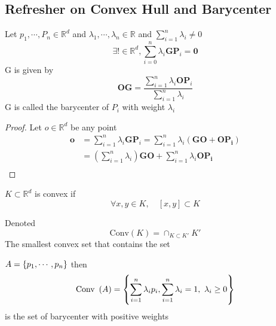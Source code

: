 \subsection{Refresher on Convex Hull and Barycenter}
\label{subsec:Refresher on Convex Hull}
\begin{prop}[]
    Let $ p_1, \cdots, P_n \in \mathbb{R}^d $ and $ \lambda_1, \cdots , \lambda_n \in
    \mathbb{R} $ and $ \sum_{i=1}^{n} \lambda_i \neq 0 $
    \[
    \exists ! \in \mathbb{R}^d , \sum_{i=0}^{n} \lambda_i \boldsymbol{GP} _i =
    \boldsymbol{0} 
    \]
    G is given by 
    \[
    \boldsymbol{OG} = \frac{ \sum_{i=1}^{n} \lambda_i \boldsymbol{OP} _i }{ \sum_{i=1}^{n}
    \lambda_i } 
    \]
    G is called the barycenter of $ P_i $ with weight $ \lambda_i $
    \label{prop:}
\end{prop}
\begin{proof}
    Let $ o \in \mathbb{R}^d  $ be any point 
    \begin{align*}
        \boldsymbol{o}  &= \sum_{i=1}^{n} \lambda_i \boldsymbol{GP} _i = \sum_{i=1}^{n}
        \lambda_i\left( \boldsymbol{GO} + \boldsymbol{OP_i} \right)   \\ 
         &= \left( \sum_{i=1}^{n} \lambda_i\right) \boldsymbol{GO} +
         \sum_{i=1}^{n}\lambda_i \boldsymbol{OP_i}   \\ 
    \end{align*}
    
\end{proof}


\begin{defn}
    $ K \subset \mathbb{R}^d $ is convex if 
    \[
        \forall x,y \in K, \quad [x,y] \subset K
    \]
    \label{def:Convec Set}
\end{defn}

\begin{defn}
    Denoted 
    \[
        \text{Conv}\left( K\right) = \cap_{K \subset K'} K' 
    \]
    The smallest convex set that contains the set
    \label{def:Convex Hull}
\end{defn}

\begin{prop}[]
    $ A = \set{ p_1, \cdots, p_n }  $ then 
    \[
    \text{Conv } \left( A\right) = \set{ \sum_{i=1}^{n} \lambda_ip_i, \sum_{i=1}^{n}
    \lambda_i = 1, \ \lambda_i \geq 0 } 
    \]
    is the set of barycenter with positive weights
    \label{prop:}
\end{prop}

